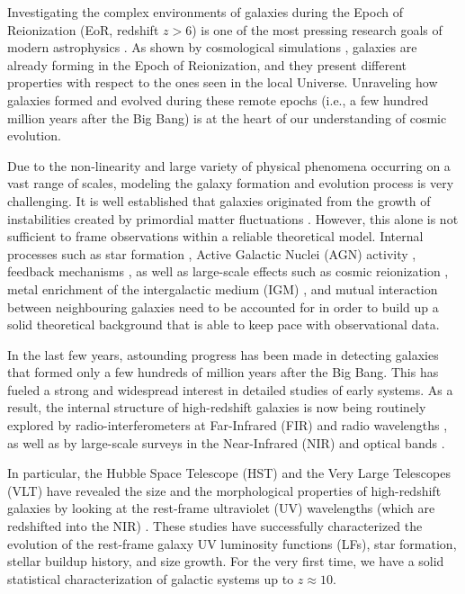 



Investigating the complex environments of galaxies during the Epoch of Reionization (EoR, redshift $z>6$) is one of the most pressing research goals of modern astrophysics \citep{Barkana:2000fd, Dayal:2018hft}. As shown by cosmological simulations \citep{Murali_2002,Vogelsberger:2019ynw, somerville2015}, galaxies are already forming in the Epoch of Reionization, and they present different properties with respect to the ones seen in the local Universe. Unraveling how galaxies formed and evolved during these remote epochs (i.e., a few hundred million years after the Big Bang) is at the heart of our understanding of cosmic evolution.

Due to the non-linearity and large variety of physical phenomena occurring on a vast range of scales, modeling the galaxy formation and evolution process is very challenging. It is well established that galaxies originated from the growth of instabilities created by primordial matter fluctuations \citep{bertschinger98}. However, this alone is not sufficient to frame observations within a reliable theoretical model. Internal processes such as star formation \citep{moster2010constraints}, Active Galactic Nuclei (AGN) activity \citep{morganti2017archaeology}, feedback mechanisms \citep{fabian12}, as well as large-scale effects such as cosmic reionization \citep{mesinger_2016}, metal enrichment of the intergalactic medium (IGM) \citep{Aguirre:2001ay}, and mutual interaction between neighbouring galaxies \citep{dressler1980, delucia2007} need to be accounted for in order to build up a solid theoretical background that is able to keep pace with observational data.

In the last few years, astounding progress has been made in detecting galaxies that formed only a few hundreds of million years after the Big Bang. This has fueled a strong and widespread interest in detailed studies of early systems. As a result, the internal structure of high-redshift galaxies is now being routinely explored by radio-interferometers at Far-Infrared (FIR) and radio wavelengths \citep{Fevre:2019thf, capak2015, decarli2016alma}, as well as by large-scale surveys in the Near-Infrared (NIR) and optical bands \citep{refId0, Madau:1996yh}. 

In particular, the Hubble Space Telescope (HST) and the Very Large Telescopes (VLT) have revealed the size and the morphological properties of high-redshift galaxies by looking at the rest-frame ultraviolet (UV) wavelengths (which are redshifted into the NIR) \citep{oesch2009structure,Shibuya:2015qfa, bouwens2017z, kawamata2018size}. These studies have successfully characterized the evolution of the rest-frame galaxy UV luminosity functions (LFs), star formation, stellar buildup history, and size growth. For the very first time, we have a solid statistical characterization of galactic systems up to $z\approx 10$. 

